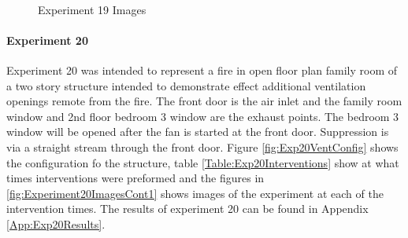 \documentclass{article}
\begin{document}
\begin{figure}[H]
	\ContinuedFloat 
	\centering 
	 \ 
	\caption{Experiment 19 Images}
	\label{fig:Experiment19ImagesCont3} 
\end{figure}

\paragraph{Experiment 20}\mbox{}

Experiment 20 was intended to represent a fire in open floor plan family room of a two story structure intended to demonstrate effect additional ventilation openings remote from the fire. The front door is the air inlet and the family room window and 2nd floor bedroom 3 window are the exhaust points. The bedroom 3 window will be opened after the fan is started at the front door. Suppression is via a straight stream through the front door. Figure \ref{fig:Exp20VentConfig} shows the configuration fo the structure, table \ref{Table:Exp20Interventions} show at what times interventions were preformed and the figures in \ref{fig:Experiment20ImagesCont1} shows images of the experiment at each of the intervention times. The results of experiment 20 can be found in Appendix \ref{App:Exp20Results}.
\end{document}
